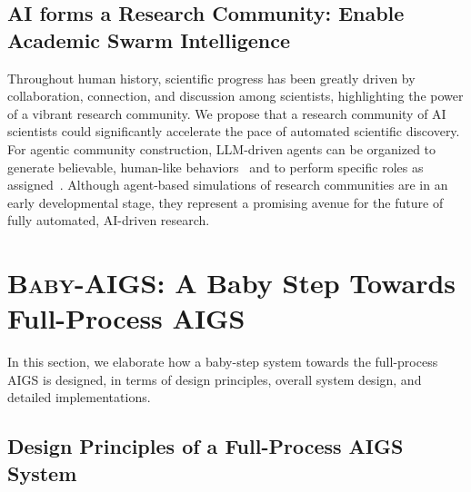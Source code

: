 \documentclass{article} %
\newcommand{\AIGS}{AIGS\xspace}
\newcommand{\AIGSSys}{\textsc{Baby-AIGS}\xspace}
\begin{document}
\subsection{AI forms a Research Community: Enable Academic Swarm Intelligence}

Throughout human history, scientific progress has been greatly driven by collaboration, connection, and discussion among scientists, highlighting the power of a vibrant research community. We propose that a research community of AI scientists could significantly accelerate the pace of automated scientific discovery. For agentic community construction, LLM-driven agents can be organized to generate believable, human-like behaviors~\citep{park2022social, gao2024large, park2023generative} and to perform specific roles as assigned~\citep{li2024agent, hua2023war, xu2023exploring}. Although agent-based simulations of research communities are in an early developmental stage, they represent a promising avenue for the future of fully automated, AI-driven research.

\vspace{-5pt}
\section{\AIGSSys: A Baby Step Towards Full-Process \AIGS}
\label{sec:proofofconcept}

In this section, we elaborate how a baby-step system towards the full-process \AIGS is designed, in terms of design principles, overall system design, and detailed implementations.

\subsection{Design Principles of a Full-Process \AIGS System}\label{sec:principle}
\end{document}
